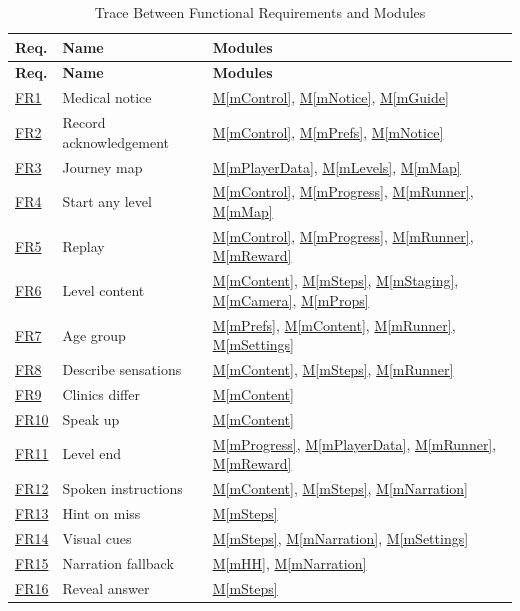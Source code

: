 \documentclass[12pt, titlepage]{article}
\newcommand{\mref}[1]{\hyperref[#1]{M\ref*{#1}}}
\newcommand{\srsurl}{https://team-hindsight.github.io/ophthamology-game/SRS/SRS.pdf}
\newcommand{\srsfrref}[2]{\href{\srsurl\#nameddest=#1}{FR#2}}
\begin{document}
\begin{longtable}{p{} p{} p{}}
\caption{Trace Between Functional Requirements and Modules} \label{TblRT}\\
\toprule
\textbf{Req.} & \textbf{Name} & \textbf{Modules}\\
\midrule
\endfirsthead
\toprule
\textbf{Req.} & \textbf{Name} & \textbf{Modules}\\
\midrule
\endhead
\srsfrref{FR_MedicalNotice}{1} & Medical notice & \mref{mControl}, \mref{mNotice}, \mref{mGuide}\\
\srsfrref{FR_RecordAck}{2} & Record acknowledgement & \mref{mControl}, \mref{mPrefs}, \mref{mNotice}\\
\srsfrref{FR_JourneyMap}{3} & Journey map & \mref{mPlayerData}, \mref{mLevels}, \mref{mMap}\\
\srsfrref{FR_StartLevel}{4} & Start any level & \mref{mControl}, \mref{mProgress}, \mref{mRunner}, \mref{mMap}\\
\srsfrref{FR_Replay}{5} & Replay & \mref{mControl}, \mref{mProgress}, \mref{mRunner}, \mref{mReward}\\
\srsfrref{FR_LevelContent}{6} & Level content & \mref{mContent}, \mref{mSteps}, \mref{mStaging}, \mref{mCamera}, \mref{mProps}\\
\srsfrref{FR_AgeGroup}{7} & Age group & \mref{mPrefs}, \mref{mContent}, \mref{mRunner}, \mref{mSettings}\\
\srsfrref{FR_DescribeSensations}{8} & Describe sensations & \mref{mContent}, \mref{mSteps}, \mref{mRunner}\\
\srsfrref{FR_ClinicsDiffer}{9} & Clinics differ & \mref{mContent}\\
\srsfrref{FR_SpeakUp}{10} & Speak up & \mref{mContent}\\
\srsfrref{FR_LevelEnd}{11} & Level end & \mref{mProgress}, \mref{mPlayerData}, \mref{mRunner}, \mref{mReward}\\
\srsfrref{FR_SpokenInstructions}{12} & Spoken instructions & \mref{mContent}, \mref{mSteps}, \mref{mNarration}\\
\srsfrref{FR_HintOnMiss}{13} & Hint on miss & \mref{mSteps}\\
\srsfrref{FR_VisualCues}{14} & Visual cues & \mref{mSteps}, \mref{mNarration}, \mref{mSettings}\\
\srsfrref{FR_NarrationFallback}{15} & Narration fallback & \mref{mHH}, \mref{mNarration}\\
\srsfrref{FR_RevealAnswer}{16} & Reveal answer & \mref{mSteps}\\

\end{longtable}
\end{document}
